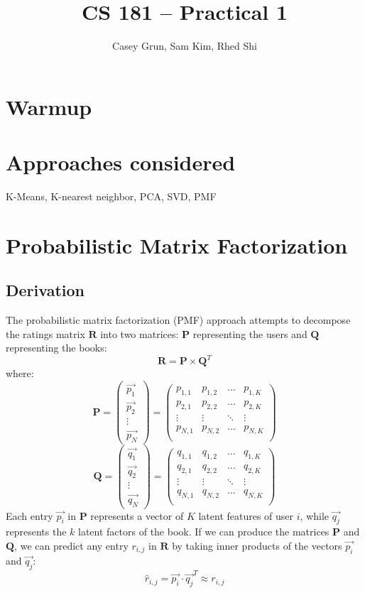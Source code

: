 \documentclass[11pt]{amsart}
\title{CS 181 -- Practical 1}
\author{Casey Grun, Sam Kim, Rhed Shi}
\newcommand{\mat}[1]{\mathbf{#1}}
\begin{document}
\maketitle

\section{Warmup}

\section{Approaches considered}
K-Means, K-nearest neighbor, PCA, SVD, PMF

\section{Probabilistic Matrix Factorization}
\subsection{Derivation}
The probabilistic matrix factorization (PMF) approach attempts to decompose the ratings matrix $\mat{R}$ into two matrices: $\mat{P}$ representing the users and $\mat{Q}$ representing the books:
$$\mat{R} = \mat{P} \times \mat{Q}^T$$
where:
$$ 
\mat{P} = 
\begin{pmatrix}
	\vec{p_1} \\
	\vec{p_2} \\
	\vdots    \\
	\vec{p_N} 
\end{pmatrix} = 
\begin{pmatrix}
	p_{1,1} & p_{1,2} & \ldots & p_{1,K} \\
	p_{2,1} & p_{2,2} & \ldots & p_{2,K} \\
	\vdots  & \vdots  & \ddots & \vdots  \\
	p_{N,1} & p_{N,2} & \ldots & p_{N,K} \\
\end{pmatrix}
$$
$$ 
\mat{Q} = 
\begin{pmatrix}
	\vec{q_1} \\
	\vec{q_2} \\
	\vdots    \\
	\vec{q_N} 
\end{pmatrix} = 
\begin{pmatrix}
	q_{1,1} & q_{1,2} & \ldots & q_{1,K} \\
	q_{2,1} & q_{2,2} & \ldots & q_{2,K} \\
	\vdots  & \vdots  & \ddots & \vdots  \\
	q_{N,1} & q_{N,2} & \ldots & q_{N,K} \\
\end{pmatrix}
$$
Each entry $\vec{p_i}$ in $\mat{P}$ represents a vector of $K$ latent features of user $i$, while $\vec{q_j}$ represents the $k$ latent factors of the book. If we can produce the matrices $\mat{P}$ and $\mat{Q}$, we can predict any entry $r_{i,j}$ in $\mat{R}$ by taking inner products of the vectors $\vec{p_i}$ and $\vec{q_j}$:
$$\hat{r}_{i,j} = \vec{p_i} \cdot \vec{q_j}^T \approx r_{i,j}$$
\end{document}
